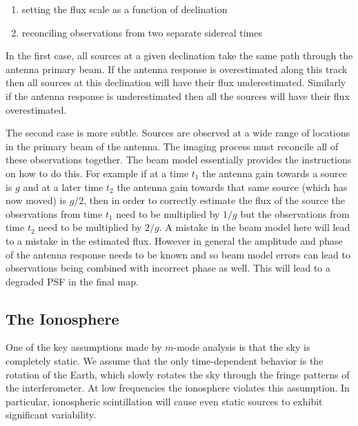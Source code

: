 \documentclass[twocolumn]{aastex61}
\newcommand{\todo}[1]{\textcolor{red}{TODO: #1}\PackageWarning{TODO:}{#1!}}
\begin{document}
\begin{enumerate}
    \item setting the flux scale as a function of declination
    \item reconciling observations from two separate sidereal times
\end{enumerate}

In the first case, all sources at a given declination take the same path through the antenna primary
beam. If the antenna response is overestimated along this track then all sources at this declination
will have their flux underestimated. Similarly if the antenna response is underestimated then all
the sources will have their flux overestimated.


The second case is more subtle. Sources are observed at a wide range of locations in the primary
beam of the antenna. The imaging process must reconcile all of these observations together. The beam
model essentially provides the instructions on how to do this. For example if at a time $t_1$ the
antenna gain towards a source is $g$ and at a later time $t_2$ the antenna gain towards that same
source (which has now moved) is $g/2$, then in order to correctly estimate the flux of the source
the observations from time $t_1$ need to be multiplied by $1/g$ but the observations from time $t_2$
need to be multiplied by $2/g$. A mistake in the beam model here will lead to a mistake in the
estimated flux.  However in general the amplitude and phase of the antenna response needs to be
known and so beam model errors can lead to observations being combined with incorrect phase as well.
This will lead to a degraded PSF in the final map.


\subsection{The Ionosphere}

One of the key assumptions made by $m$-mode analysis is that the sky is completely static.  We
assume that the only time-dependent behavior is the rotation of the Earth, which slowly rotates the
sky through the fringe patterns of the interferometer. At low frequencies the ionosphere violates
this assumption. In particular, ionospheric scintillation will cause even static sources to exhibit
significant variability.
\end{document}
